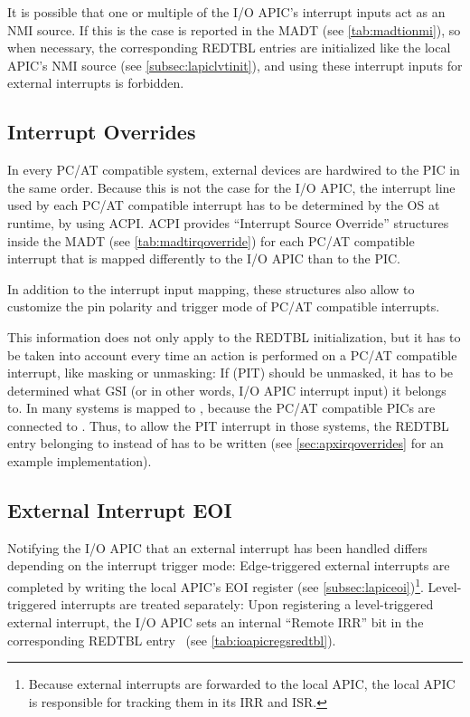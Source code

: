 It is possible that one or multiple of the I/O APIC's interrupt inputs act as an NMI source. If
this is the case is reported in the MADT (see \autoref{tab:madtionmi}), so when necessary, the
corresponding REDTBL entries are initialized like the local APIC's NMI source (see
\autoref{subsec:lapiclvtinit}), and using these interrupt inputs for external interrupts is
forbidden.

\subsection{Interrupt Overrides}
\label{subsec:ioapicpcat}

In every PC/AT compatible system, external devices are hardwired to the PIC in the same order.
Because this is not the case for the I/O APIC, the interrupt line used by each PC/AT compatible
interrupt has to be determined by the OS at runtime, by using ACPI. ACPI provides ``Interrupt
Source Override'' structures~\cite[sec.~5.2.8.3.1]{acpi1} inside the MADT (see
\autoref{tab:madtirqoverride}) for each PC/AT compatible interrupt that is mapped differently to
the I/O APIC than to the PIC\@.

In addition to the interrupt input mapping, these structures also allow to customize the pin
polarity and trigger mode of PC/AT compatible interrupts.

This information does not only apply to the REDTBL initialization, but it has to be taken into
account every time an action is performed on a PC/AT compatible interrupt, like masking or
unmasking: If  (PIT) should be unmasked, it has to be determined what GSI (or in other
words, I/O APIC interrupt input) it belongs to. In many systems  is mapped to
, because the PC/AT compatible PICs are connected to . Thus, to allow the PIT
interrupt in those systems, the REDTBL entry belonging to  instead of  has to
be written (see \autoref{sec:apxirqoverrides} for an example implementation).

\subsection{External Interrupt EOI}
\label{subsec:ioapiceoi}

Notifying the I/O APIC that an external interrupt has been handled differs depending on the
interrupt trigger mode: Edge-triggered external interrupts are completed by writing the local
APIC's EOI register (see \autoref{subsec:lapiceoi})\footnote{Because external interrupts are
  forwarded to the local APIC, the local APIC is responsible for tracking them in its IRR and ISR.}.
Level-triggered interrupts are treated separately: Upon registering a level-triggered external
interrupt, the I/O APIC sets an internal ``Remote IRR'' bit in the corresponding REDTBL
entry~\cite[sec.~9.5.8]{ich5} (see \autoref{tab:ioapicregsredtbl}).

